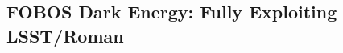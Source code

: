 \documentclass[oneside,11pt]{amsart}
\newcommand{\note}[2][todo]{{\color{#1}[[{\bf #2}]]}}
\begin{document}
%


\subsection{FOBOS Dark Energy: Fully Exploiting LSST/Roman} 
\label{sec:goals}
\label{sec:cosmology}
\end{document}
